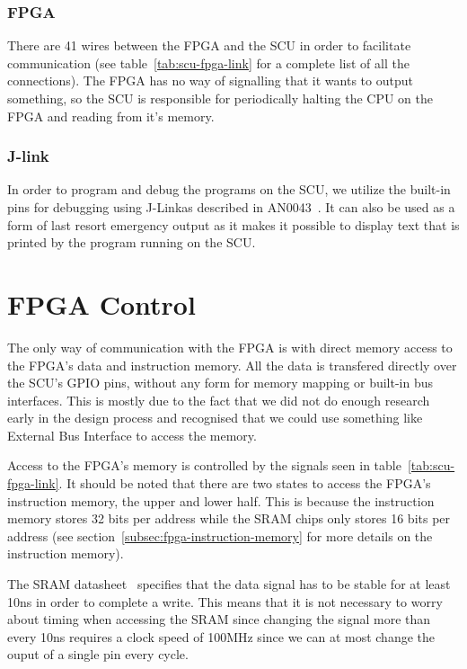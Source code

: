\subsubsection{FPGA}
There are 41 wires between the FPGA and the SCU in order to facilitate communication (see table~\ref{tab:scu-fpga-link} for a complete list of all the connections).
The FPGA has no way of signalling that it wants to output something, so the SCU is responsible for periodically halting the CPU on the FPGA and reading from it's memory.

\subsubsection{J-link}
In order to program and debug the programs on the SCU, we utilize the built-in pins for debugging using J-Link\texttrademark as described in AN0043~\cite{an0043}.
It can also be used as a form of last resort emergency output as it makes it possible to display text that is printed by the program running on the SCU.

\section{FPGA Control}
The only way of communication with the FPGA is with direct memory access to the FPGA's data and instruction memory.
All the data is transfered directly over the SCU's GPIO pins, without any form for memory mapping or built-in bus interfaces.
This is mostly due to the fact that we did not do enough research early in the design process and recognised that we could use something like External Bus Interface to access the memory.

Access to the FPGA's memory is controlled by the signals seen in table~\ref{tab:scu-fpga-link}.
It should be noted that there are two states to access the FPGA's instruction memory, the upper and lower half.
This is because the instruction memory stores 32 bits per address while the SRAM chips only stores 16 bits per address (see section~\ref{subsec:fpga-instruction-memory} for more details on the instruction memory).

The SRAM datasheet~\cite{sram-datasheet} specifies that the data signal has to be stable for at least 10ns in order to complete a write.
This means that it is not necessary to worry about timing when accessing the SRAM since changing the signal more than every 10ns requires a clock speed of 100MHz since we can at most change the ouput of a single pin every cycle.

